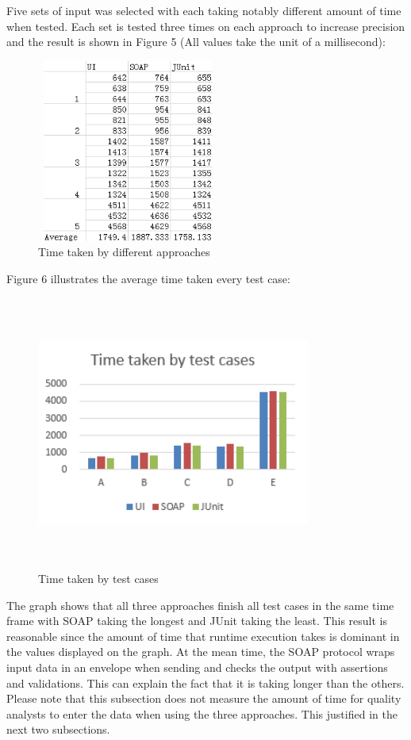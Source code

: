 \documentclass[12pt]{article}
\begin{document}
Five sets of input was selected with each taking notably different amount of time when tested. Each set is tested three times on each approach to increase precision and the result is shown in Figure 5 (All values take the unit of a millisecond):\\


\begin{figure}[ht!]
\centering
\includegraphics[width=6cm,height=6cm,keepaspectratio]{img/timeTable.jpg}
\caption{Time taken by different approaches}
\label{overflow}
\end{figure}


Figure 6 illustrates the average time taken every test case:\\

\begin{figure}[ht!]
\centering
\includegraphics[width=9cm,height=9cm,keepaspectratio]{img/timeGraph.jpg}
\caption{Time taken by test cases}
\label{overflow}
\end{figure}

The graph shows that all three approaches finish all test cases in the same time frame with SOAP taking the longest and JUnit taking the least. This result is reasonable since the amount of time that runtime execution takes is dominant in the values displayed on the graph. At the mean time, the SOAP protocol wraps input data in an envelope when sending and checks the output with assertions and validations. This can explain the fact that it is taking longer than the others. Please note that this subsection does not measure the amount of time for quality analysts to enter the data when using the three approaches. This justified in the next two subsections. \\
\end{document}
